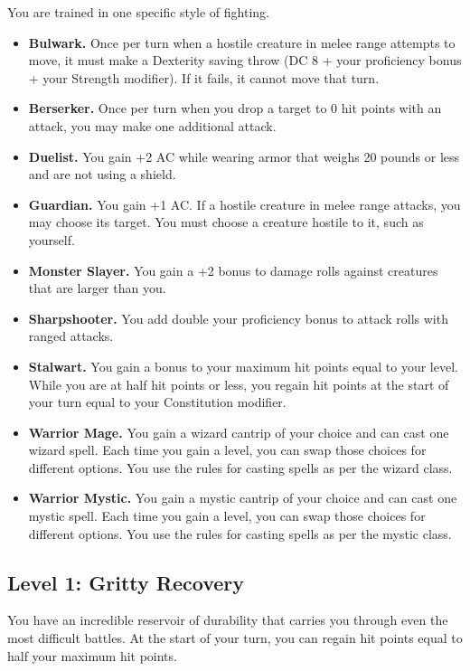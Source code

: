 \documentclass[12pt,letterpaper,twocolumn,openany,nodeprecatedcode,bg=none]{dndbook}
\providecommand{\tightlist}{%
  \setlength{\itemsep}{0pt}\setlength{\parskip}{0pt}}
\begin{document}
You are trained in one specific style of fighting.

\begin{itemize}
\tightlist
\item
  \textbf{Bulwark.} Once per turn when a hostile creature in melee range
  attempts to move, it must make a Dexterity saving throw (DC 8 + your
  proficiency bonus + your Strength modifier). If it fails, it cannot
  move that turn.
\item
  \textbf{Berserker.} Once per turn when you drop a target to 0 hit
  points with an attack, you may make one additional attack.
\item
  \textbf{Duelist.} You gain +2 AC while wearing armor that weighs 20
  pounds or less and are not using a shield.
\item
  \textbf{Guardian.} You gain +1 AC. If a hostile creature in melee
  range attacks, you may choose its target. You must choose a creature
  hostile to it, such as yourself.
\item
  \textbf{Monster Slayer.} You gain a +2 bonus to damage rolls against
  creatures that are larger than you.
\item
  \textbf{Sharpshooter.} You add double your proficiency bonus to attack
  rolls with ranged attacks.
\item
  \textbf{Stalwart.} You gain a bonus to your maximum hit points equal
  to your level. While you are at half hit points or less, you regain
  hit points at the start of your turn equal to your Constitution
  modifier.
\item
  \textbf{Warrior Mage.} You gain a wizard cantrip of your choice and
  can cast one wizard spell. Each time you gain a level, you can swap
  those choices for different options. You use the rules for casting
  spells as per the wizard class.
\item
  \textbf{Warrior Mystic.} You gain a mystic cantrip of your choice and
  can cast one mystic spell. Each time you gain a level, you can swap
  those choices for different options. You use the rules for casting
  spells as per the mystic class.
\end{itemize}

\subsection{Level 1: Gritty Recovery}\label{level-1-gritty-recovery}

You have an incredible reservoir of durability that carries you through
even the most difficult battles. At the start of your turn, you can
regain hit points equal to half your maximum hit points.
\end{document}
